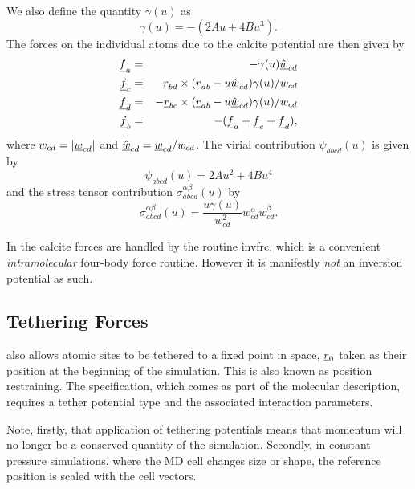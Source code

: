 We also define the quantity $\gamma(u)$ as
\begin{equation}
\gamma(u)=-(2Au+4Bu^{3}).
\end{equation}
The forces on the individual atoms due to the calcite potential are then given
by 
\begin{eqnarray}
\mbox{$\underline{f}$}_{a}&=&-\gamma(u)\hat{\mbox{$\underline{w}$}}_{cd} \nonumber \\
\mbox{$\underline{f}$}_{c}&=&\phantom{+}\mbox{$\underline{r}$}_{bd}\times(\mbox{$\underline{r}$}_{ab}-
u\hat{\mbox{$\underline{w}$}}_{cd})\gamma(u)/w_{cd} \nonumber \\
\mbox{$\underline{f}$}_{d}&=&-\mbox{$\underline{r}$}_{bc}\times(\mbox{$\underline{r}$}_{ab}-
u\hat{\mbox{$\underline{w}$}}_{cd})\gamma(u)/w_{cd} \nonumber \\
\mbox{$\underline{f}$}_{b}&=&-(\mbox{$\underline{f}$}_{a}+\mbox{$\underline{f}$}_{c}+\mbox{$\underline{f}$}_{d}),
\end{eqnarray}
where $w_{cd}=|\mbox{$\underline{w}$}_{cd}|$ and $\hat{\mbox{$\underline{w}$}}_{cd}=\mbox{$\underline{w}$}_{cd}/w_{cd}$.
The virial contribution $\psi_{abcd}(u)$ is given by
\begin{equation}
\psi_{abcd}(u)=2Au^{2}+4Bu^{4}
\end{equation}
and the stress tensor contribution $\sigma_{abcd}^{\alpha\beta}(u)$ by
\begin{equation}
\sigma_{abcd}^{\alpha\beta}(u)=\frac{u\gamma(u)}{
  w_{cd}^{2}}w_{cd}^{\alpha}w_{cd}^{\beta}.
\end{equation}

In \D{} the calcite forces are handled by the routine
{\sc invfrc}, which is a convenient {\em intramolecular} four-body force
routine. However it is manifestly {\em not} an inversion potential as such.

\subsection{Tethering Forces}

\D{} also allows atomic sites to be tethered to a fixed point in space, $\mbox{$\underline{r}$}_0$ taken as their
position at the beginning of the simulation. This is also known as position restraining.
The specification, which comes as part of the molecular description,
requires a tether potential type and the associated interaction parameters.

Note, firstly, that application of tethering potentials means that momentum will
no longer be a conserved quantity of the simulation. Secondly, in constant
pressure simulations, where the MD cell changes size or shape, the reference position
is scaled with the cell vectors.

